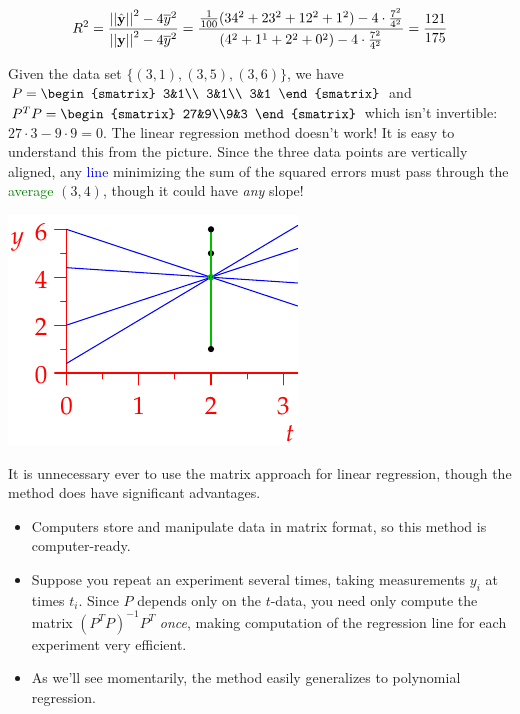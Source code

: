 \begin{examples}{}{}
	\[
		R^2=\frac{\left| \left| \hat{{\mathbf{y}}}\right|\right|^2-4\overline{y}^2}{\left| \left| {\mathbf{y}}\right|\right|^2-4\overline{y}^2} =\frac{\frac 1{100}(34^2+23^2+12^2+1^2)-4\cdot\frac{7^2}{4^2}}{(4^2+1^1+2^2+0^2)-4\cdot\frac{7^2}{4^2}} =\frac{121}{175}
	\]
	\begin{enumerate}\setcounter{enumi}{1}
	  \begin{minipage}[t]{0.65\linewidth}\vspace{0pt}
		  \item Given the data set $\{(3,1),(3,5),(3,6)\}$, we have $P=
		  \begin{smatrix}
		   3&1\\
		   3&1\\
		   3&1
		  \end{smatrix}$ and $P^TP=
		  \begin{smatrix}
		   27&9\\9&3
		  \end{smatrix}$ 
		  which isn't invertible: $27\cdot 3-9\cdot 9=0$. The linear regression method doesn't work!\smallbreak
		  It is easy to understand this from the picture. Since the three data points are vertically aligned, any \textcolor{blue}{line} minimizing the sum of the squared errors must pass through the \textcolor{Green}{average} $(3,4)$, though it could have \emph{any} slope!
		\end{minipage}
		\hfill
		\begin{minipage}[t]{0.34\linewidth}\vspace{0pt}
		  \flushright\includegraphics{reg-line6}
	  \end{minipage}
	\end{enumerate}
\end{examples}

It is unnecessary ever to use the matrix approach for linear regression, though the method does have significant advantages.
\begin{itemize}
  \item Computers store and manipulate data in matrix format, so this method is computer-ready.
  \item Suppose you repeat an experiment several times, taking measurements $y_i$ at times $t_i$. Since $P$ depends only on the $t$-data, you need only compute the matrix $(P^TP)^{-1}P^T$ \emph{once}, making computation of the regression line for each experiment very efficient. 
  \item As we'll see momentarily, the method easily generalizes to polynomial regression.
\end{itemize}

